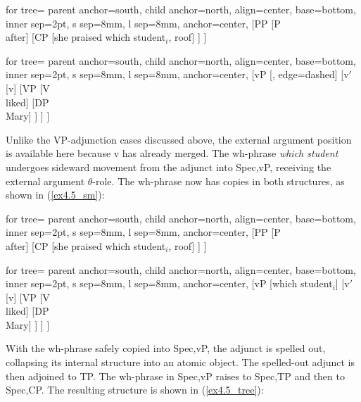 \documentclass[12pt]{article}
\newcommand{\TwoTreeCols}[2]{%
  \noindent\parbox[t]{0.47\linewidth}{#1}%
  \hspace{1.2em}%
  \parbox[t]{0.47\linewidth}{#2}\par
}
\begin{document}
\ex \label{ex4.5_ws}
\TwoTreeCols{%
\begin{forest}
for tree={
  parent anchor=south,
  child anchor=north,
  align=center,
  base=bottom,
  inner sep=2pt,
  s sep=8mm,
  l sep=8mm,
  anchor=center,
}
[PP
  [P\\after]
  [CP
    [{she praised which student$_i$}, roof]
  ]
]
\end{forest}%
}{%
\begin{forest}
for tree={
  parent anchor=south,
  child anchor=north,
  align=center,
  base=bottom,
  inner sep=2pt,
  s sep=8mm,
  l sep=8mm,
  anchor=center,
}
[vP
  [\phantom{which student$_i$}, edge={dashed}]
  [v$'$
    [v]
    [VP
      [V\\liked]
      [DP\\Mary]
    ]
  ]
]
\end{forest}%
}
\xe

\noindent
Unlike the VP-adjunction cases discussed above, the external argument position is available here because v has already merged. The wh-phrase \textit{which student} undergoes sideward movement from the adjunct into Spec,vP, receiving the external argument $\theta$-role. The wh-phrase now has copies in both structures, as shown in (\ref{ex4.5_sm}):

\ex \label{ex4.5_sm}
\TwoTreeCols{%
\begin{forest}
for tree={
  parent anchor=south,
  child anchor=north,
  align=center,
  base=bottom,
  inner sep=2pt,
  s sep=8mm,
  l sep=8mm,
  anchor=center,
}
[PP
  [P\\after]
  [CP
    [{she praised which student$_i$}, roof]
  ]
]
\end{forest}%
}{%
\begin{forest}
for tree={
  parent anchor=south,
  child anchor=north,
  align=center,
  base=bottom,
  inner sep=2pt,
  s sep=8mm,
  l sep=8mm,
  anchor=center,
}
[vP
  [{which student}$_i$]
  [v$'$
    [v]
    [VP
      [V\\liked]
      [DP\\Mary]
    ]
  ]
]
\end{forest}%
}
\xe

\noindent
With the wh-phrase safely copied into Spec,vP, the adjunct is spelled out, collapsing its internal structure into an atomic object. The spelled-out adjunct is then adjoined to TP. The wh-phrase in Spec,vP raises to Spec,TP and then to Spec,CP. The resulting structure is shown in (\ref{ex4.5_tree}):
\end{document}

